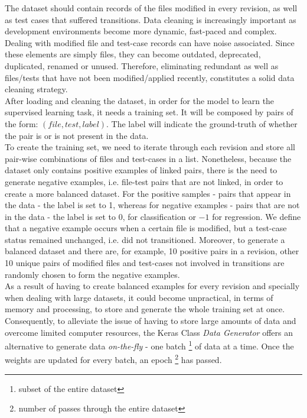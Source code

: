 The dataset should contain records of the files modified in every revision, as well as test cases that suffered transitions. 
Data cleaning is increasingly important as development environments become more dynamic, fast-paced and complex. Dealing with modified file and test-case records can have noise associated. Since these elements are simply files, they can become outdated, deprecated, duplicated, renamed or unused. Therefore, eliminating redundant as well as files/tests that have not been modified/applied recently, constitutes a solid data cleaning strategy.
\\

After loading and cleaning the dataset, in order for the model to learn the supervised learning task, it needs a training set. It will be composed by pairs of the form: $(file, test, label)$. The label will indicate the ground-truth of whether the pair is or is not present in the data. 
\\

To create the training set, we need to iterate through each revision and store all pair-wise combinations of files and test-cases in a list. Nonetheless, because the dataset only contains positive examples of linked pairs, there is the need to generate negative examples, i.e. file-test pairs that are not linked, in order to create a more balanced dataset. For the positive samples - pairs that appear in the data - the label is set to 1, whereas for negative examples - pairs that are not in the data - the label is set to $0$, for classification or $-1$ for regression. We define that a negative example occurs when a certain file is modified, but a test-case status remained unchanged, i.e. did not transitioned. Moreover, to generate a balanced dataset and there are, for example, 10 positive pairs in a revision, other 10 unique pairs of modified files and test-cases not involved in transitions are randomly chosen to form the negative examples.
\\

As a result of having to create balanced examples for every revision and specially when dealing with large datasets, it could become unpractical, in terms of memory and processing, to store and generate the whole training set at once. Consequently, to alleviate the issue of having to store large amounts of data and overcome limited computer resources, the Keras Class \textit{Data Generator} offers an alternative to generate data \textit{on-the-fly} - one batch \footnote{subset of the entire dataset} of data at a time. Once the weights are updated for every batch, an epoch \footnote{number of passes through the entire dataset} has passed. 
\\

